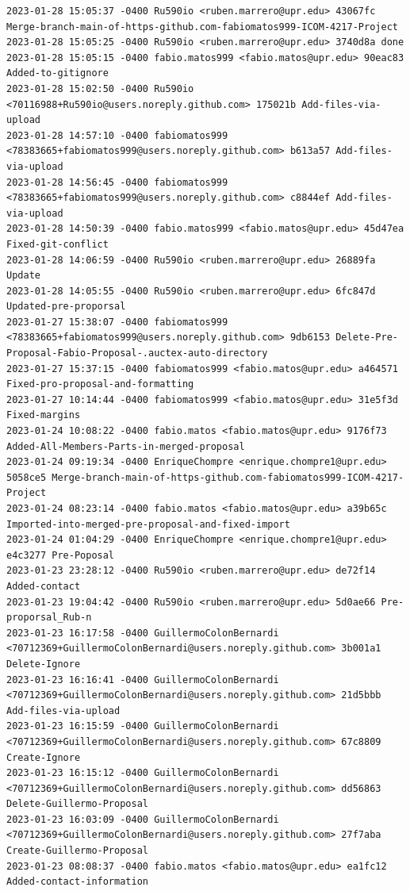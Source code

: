 \documentclass[12pt]{article}
\begin{document}
\begin{lstlisting}
2023-01-28 15:05:37 -0400 Ru590io <ruben.marrero@upr.edu> 43067fc Merge-branch-main-of-https-github.com-fabiomatos999-ICOM-4217-Project
2023-01-28 15:05:25 -0400 Ru590io <ruben.marrero@upr.edu> 3740d8a done
2023-01-28 15:05:15 -0400 fabio.matos999 <fabio.matos@upr.edu> 90eac83 Added-to-gitignore
2023-01-28 15:02:50 -0400 Ru590io <70116988+Ru590io@users.noreply.github.com> 175021b Add-files-via-upload
2023-01-28 14:57:10 -0400 fabiomatos999 <78383665+fabiomatos999@users.noreply.github.com> b613a57 Add-files-via-upload
2023-01-28 14:56:45 -0400 fabiomatos999 <78383665+fabiomatos999@users.noreply.github.com> c8844ef Add-files-via-upload
2023-01-28 14:50:39 -0400 fabio.matos999 <fabio.matos@upr.edu> 45d47ea Fixed-git-conflict
2023-01-28 14:06:59 -0400 Ru590io <ruben.marrero@upr.edu> 26889fa Update
2023-01-28 14:05:55 -0400 Ru590io <ruben.marrero@upr.edu> 6fc847d Updated-pre-proporsal
2023-01-27 15:38:07 -0400 fabiomatos999 <78383665+fabiomatos999@users.noreply.github.com> 9db6153 Delete-Pre-Proposal-Fabio-Proposal-.auctex-auto-directory
2023-01-27 15:37:15 -0400 fabiomatos999 <fabio.matos@upr.edu> a464571 Fixed-pro-proposal-and-formatting
2023-01-27 10:14:44 -0400 fabiomatos999 <fabio.matos@upr.edu> 31e5f3d Fixed-margins
2023-01-24 10:08:22 -0400 fabio.matos <fabio.matos@upr.edu> 9176f73 Added-All-Members-Parts-in-merged-proposal
2023-01-24 09:19:34 -0400 EnriqueChompre <enrique.chompre1@upr.edu> 5058ce5 Merge-branch-main-of-https-github.com-fabiomatos999-ICOM-4217-Project
2023-01-24 08:23:14 -0400 fabio.matos <fabio.matos@upr.edu> a39b65c Imported-into-merged-pre-proposal-and-fixed-import
2023-01-24 01:04:29 -0400 EnriqueChompre <enrique.chompre1@upr.edu> e4c3277 Pre-Poposal
2023-01-23 23:28:12 -0400 Ru590io <ruben.marrero@upr.edu> de72f14 Added-contact
2023-01-23 19:04:42 -0400 Ru590io <ruben.marrero@upr.edu> 5d0ae66 Pre-proporsal_Rub-n
2023-01-23 16:17:58 -0400 GuillermoColonBernardi <70712369+GuillermoColonBernardi@users.noreply.github.com> 3b001a1 Delete-Ignore
2023-01-23 16:16:41 -0400 GuillermoColonBernardi <70712369+GuillermoColonBernardi@users.noreply.github.com> 21d5bbb Add-files-via-upload
2023-01-23 16:15:59 -0400 GuillermoColonBernardi <70712369+GuillermoColonBernardi@users.noreply.github.com> 67c8809 Create-Ignore
2023-01-23 16:15:12 -0400 GuillermoColonBernardi <70712369+GuillermoColonBernardi@users.noreply.github.com> dd56863 Delete-Guillermo-Proposal
2023-01-23 16:03:09 -0400 GuillermoColonBernardi <70712369+GuillermoColonBernardi@users.noreply.github.com> 27f7aba Create-Guillermo-Proposal
2023-01-23 08:08:37 -0400 fabio.matos <fabio.matos@upr.edu> ea1fc12 Added-contact-information

\end{lstlisting}
\end{document}
